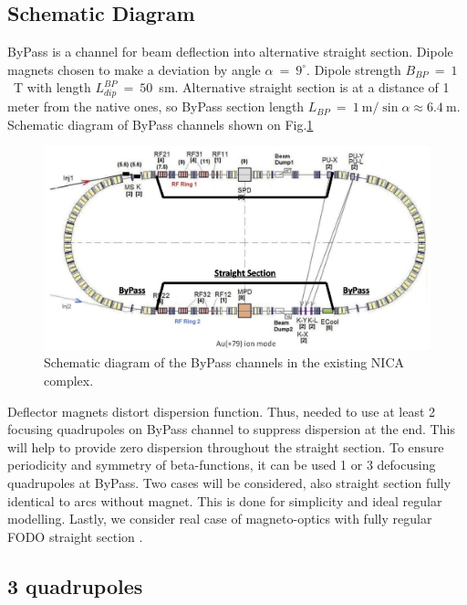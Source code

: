 \documentclass[a4paper,
               keeplastbox,   %
               ]{jacow}
\begin{document}
\subsection{Schematic Diagram}

\par ByPass is a channel for beam deflection into alternative straight section. Dipole magnets chosen to make a deviation by angle $\alpha~=~9^\circ$. Dipole strength $B_{BP}~=~1$~T with length $L^{BP}_{dip}~=~50$~sm. Alternative straight section is at a distance of 1 meter from the native ones, so ByPass section length $L_{BP}~=~1~\text{m}/\sin{\alpha}\approx6.4~\text{m}$. Schematic diagram of ByPass channels shown on Fig.\ref{fig:schematic}

\begin{figure}[!htb]
   \centering
   \includegraphics*[width=1.\columnwidth]{img/MOPA072_f1-1}
   \caption{Schematic diagram of the ByPass channels in the existing NICA complex.}
   \label{fig:schematic}
\end{figure}

\par Deflector magnets distort dispersion function. 
Thus, needed to use at least 2 focusing quadrupoles on ByPass channel to suppress dispersion at the end. This will help to provide zero dispersion throughout the straight section.
To ensure periodicity and symmetry of beta-functions, it can be used 1 or 3 defocusing quadrupoles at ByPass. 
Two cases will be considered, also straight section fully identical to arcs without magnet.
This is done for simplicity and ideal regular modelling.
Lastly, we consider real case of magneto-optics with fully regular FODO straight section .

\subsection{3 quadrupoles}
\end{document}
